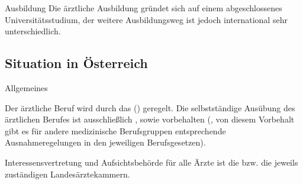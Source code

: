 \Text
{Ausbildung}
{Die ärztliche Ausbildung gründet sich auf einem
abgeschlossenes Universitätsstudium, der weitere
Ausbildungsweg ist jedoch international sehr
unterschiedlich.}
{}
{}
{}
{}



\subsection{Situation in Österreich}

\Text
{Allgemeines}
{Der ärztliche Beruf wird durch das  () geregelt.
Die selbstständige Ausübung des ärztlichen Berufes
ist ausschließlich ,  sowie 
vorbehalten (, von diesem Vorbehalt gibt es für andere medizinische Berufsgruppen
entsprechende Ausnahmeregelungen in den jeweiligen
Berufsgesetzen). 

Interessensvertretung und Aufsichtsbehörde für alle Ärzte
ist die  bzw. die jeweils
zuständigen Landesärztekammern.}
{}
{}
{}
{}

